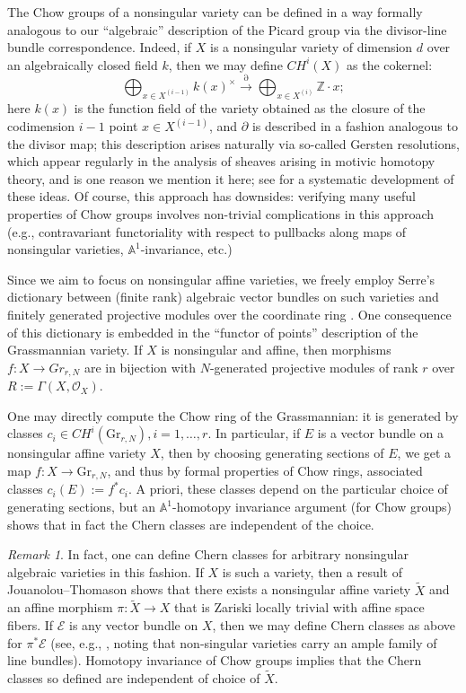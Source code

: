 \documentclass[11pt,leqno]{article}
\newcommand{\Z}{{\mathbb Z}}
\newcommand{\aone}{{\mathbb A}^1}
\renewcommand{\1}{{\rm 1\hspace*{-0.4ex}%
\rule{0.1ex}{1.52ex}\hspace*{0.2ex}}}
\newcommand{\<}[1]{{\langle}#1 {\rangle}}
\theoremstyle{plain}
\theoremstyle{definition}
\theoremstyle{remark}
\newtheorem{rem}[theorem]{Remark}
\numberwithin{equation}{subsection}
\begin{document}
The Chow groups of a nonsingular variety can be defined in a way formally analogous to our ``algebraic'' description of the Picard group via the divisor-line bundle correspondence.  Indeed, if $X$ is a nonsingular variety of dimension $d$ over an algebraically closed field $k$, then we may define $CH^i(X)$ as the cokernel: 
\[
\bigoplus_{x \in X^{(i-1)}} k(x)^{\times} \stackrel{\partial}{\longrightarrow} \bigoplus_{x \in X^{(i)}} \Z \cdot x;
\]
here $k(x)$ is the function field of the variety obtained as the closure of the codimension $i-1$ point $x \in X^{(i-1)}$, and $\partial$ is described in a fashion analogous to the divisor map; this description arises naturally via so-called Gersten resolutions, which appear regularly in the analysis of sheaves arising in motivic homotopy theory, and is one reason we mention it here; see \cite{Rost1996ChowGroupsCoefficients} for a systematic development of these ideas.  Of course, this approach has downsides: verifying many useful properties of Chow groups involves non-trivial complications in this approach (e.g., contravariant functoriality with respect to pullbacks along maps of nonsingular varieties, $\aone$-invariance, etc.)

Since we aim to focus on nonsingular affine varieties, we freely employ Serre's dictionary between (finite rank) algebraic vector bundles on such varieties and finitely generated projective modules over the coordinate ring \cite{SerreFAC}.  One consequence of this dictionary is embedded in the ``functor of points'' description of the Grassmannian variety.  If $X$ is nonsingular and affine, then morphisms $f: X \to Gr_{r,N}$ are in bijection with $N$-generated projective modules of rank $r$ over $R:= \Gamma(X,\mathscr{O}_X)$.  

One may directly compute the Chow ring of the Grassmannian: it is generated by classes $c_i \in CH^i(\mathrm{Gr}_{r,N}), i = 1,\ldots,r$.  In particular, if $E$ is a vector bundle on a nonsingular affine variety $X$, then by choosing generating sections of $E$, we get a map $f: X \to \mathrm{Gr}_{r,N}$, and thus by formal properties of Chow rings, associated classes $c_i(E) := f^*c_i$.  A priori, these classes depend on the particular choice of generating sections, but an $\aone$-homotopy invariance argument (for Chow groups) shows that in fact the Chern classes are independent of the choice.  

\begin{rem}
	In fact, one can define Chern classes for arbitrary nonsingular algebraic varieties in this fashion.  If $X$ is such a variety, then a result of Jouanolou--Thomason shows that there exists a nonsingular affine variety $\tilde{X}$ and an affine morphism $\pi: \tilde{X} \to X$ that is Zariski locally trivial with affine space fibers.  If $\mathscr{E}$ is any vector bundle on $X$, then we may define Chern classes as above for $\pi^*\mathscr{E}$ (see, e.g., \cite[Proposition 4.4]{Weibel1989}, noting that non-singular varieties carry an ample family of line bundles).  Homotopy invariance of Chow groups implies that the Chern classes so defined are independent of choice of $\tilde{X}$.  
\end{rem}
\end{document}
